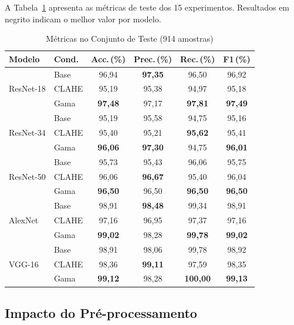\documentclass[conference]{IEEEtran}
\begin{document}
A Tabela~\ref{tab:resultados} apresenta as métricas de teste dos 15
experimentos. Resultados em negrito indicam o melhor valor por modelo.

\begin{table}[htbp]
\caption{Métricas no Conjunto de Teste (914 amostras)}
\label{tab:resultados}
\begin{center}
\renewcommand{\arraystretch}{1.2}
\setlength{\tabcolsep}{3.5pt}
\begin{tabular}{llcccc}
\toprule
\textbf{Modelo} & \textbf{Cond.} &
\textbf{Acc.\,(\%)} & \textbf{Prec.\,(\%)} &
\textbf{Rec.\,(\%)} & \textbf{F1\,(\%)} \\
\midrule
\multirow{3}{*}{ResNet-18}
 & Base  & 96,94 & \textbf{97,35} & 96,50 & 96,92 \\
 & CLAHE & 95,19 & 95,38 & 94,97 & 95,18 \\
 & Gama & \textbf{97,48} & 97,17 & \textbf{97,81} & \textbf{97,49} \\
\midrule
\multirow{3}{*}{ResNet-34}
 & Base  & 95,19 & 95,58 & 94,75 & 95,16 \\
 & CLAHE & 95,40 & 95,21 & \textbf{95,62} & 95,41 \\
 & Gama & \textbf{96,06} & \textbf{97,30} & 94,75 & \textbf{96,01} \\
\midrule
\multirow{3}{*}{ResNet-50}
 & Base  & 95,73 & 95,43 & 96,06 & 95,75 \\
 & CLAHE & 96,06 & \textbf{96,67} & 95,40 & 96,04 \\
 & Gama & \textbf{96,50} & 96,50 & \textbf{96,50} & \textbf{96,50} \\
\midrule
\multirow{3}{*}{AlexNet}
 & Base  & 98,91 & \textbf{98,48} & 99,34 & 98,91 \\
 & CLAHE & 97,16 & 96,95 & 97,37 & 97,16 \\
 & Gama & \textbf{99,02} & 98,28 & \textbf{99,78} & \textbf{99,02} \\
\midrule
\multirow{3}{*}{VGG-16}
 & Base  & 98,91 & 98,06 & 99,78 & 98,92 \\
 & CLAHE & 98,36 & \textbf{99,11} & 97,59 & 98,35 \\
 & Gama & \textbf{99,12} & 98,28 & \textbf{100,00} & \textbf{99,13} \\
\bottomrule
\end{tabular}
\end{center}
\end{table}

\subsection{Impacto do Pré-processamento}
\end{document}
